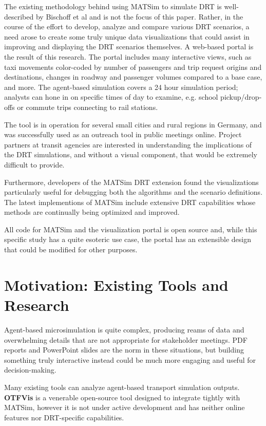 The existing methodology behind using MATSim to simulate DRT is well-described by Bischoff et al \cite{Bischoff2020,BischoffMaciejewskiNagel2017SharedTaxiIITSC} and is not the focus of this paper. Rather, in the course of the effort to develop, analyze and compare various DRT scenarios, a need arose to create some truly unique data visualizations that could assist in improving and displaying the DRT scenarios themselves. A web-based portal is the result of this research. The portal includes many interactive views, such as taxi movements color-coded by number of passengers and trip request origins and destinations, changes in roadway and passenger volumes compared to a base case, and more. The agent-based simulation covers a 24 hour simulation period; analysts can hone in on specific times of day to examine, e.g. school pickup/drop-offs or commute trips connecting to rail stations.

The tool is in operation for several small cities and rural regions in Germany, and was successfully used as an outreach tool in public meetings online. Project partners at transit agencies are interested in understanding the implications of the DRT simulations, and without a visual component, that would be extremely difficult to provide.

Furthermore, developers of the MATSim DRT extension found the visualizations particularly useful for debugging both the algorithms and the scenario definitions. The latest implementions of MATSim include extensive DRT capabilities whose methods are continually being optimized and improved.

All code for MATSim and the visualization portal is open source and, while this specific study has a quite esoteric use case, the portal has an extensible design that could be modified for other purposes.

\section{Motivation: Existing Tools and Research}
\label{motivation}

Agent-based microsimulation is quite complex, producing reams of data and overwhelming details that are not appropriate for stakeholder meetings. PDF reports and PowerPoint slides are the norm in these situations, but building something truly interactive instead could be much more engaging and useful for decision-making.

Many existing tools can analyze agent-based transport simulation outputs. \textbf{OTFVis} \cite{Srippgen2015OTFVisInBook} is a venerable open-source tool designed to integrate tightly with MATSim, however it is not under active development and has neither online features nor DRT-specific capabilities.

